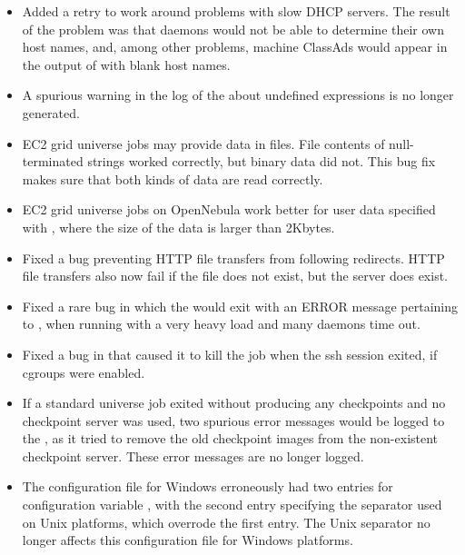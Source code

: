 \begin{itemize}

\item Added a retry to work around problems with slow
DHCP servers.  The result of the problem was that daemons
would not be able to determine their own host names,
and, among other problems, machine ClassAds would appear
in the output of  with blank host names.

\item A spurious warning in the log of the  
about undefined  expressions
is no longer generated.

\item EC2 grid universe jobs may provide data in files.
File contents of null-terminated strings worked correctly,
but binary data did not.
This bug fix makes sure that both kinds of data are read correctly.

\item EC2 grid universe jobs on OpenNebula work better for user data
specified with ,
where the size of the data is larger than 2Kbytes.

\item Fixed a bug preventing HTTP file transfers from following redirects.
HTTP file transfers also now fail if the file does not exist,
but the server does exist.

\item Fixed a rare bug in which the  would exit
with an ERROR message pertaining to ,
when running with a very heavy load and many  daemons
time out.

\item Fixed a bug in 
that caused it to kill the job when the ssh session exited,
if cgroups were enabled.

\item If a standard universe job exited without producing any checkpoints 
and no checkpoint server was used, 
two spurious error messages would be logged to the , 
as it tried to remove the old checkpoint images from the 
non-existent checkpoint server. 
These error messages are no longer logged.

\item The configuration file for Windows erroneously had two entries
for configuration variable ,
with the second entry specifying the
separator used on Unix platforms, which overrode the first entry. 
The Unix separator no longer affects this configuration file
for Windows platforms.


\end{itemize}
